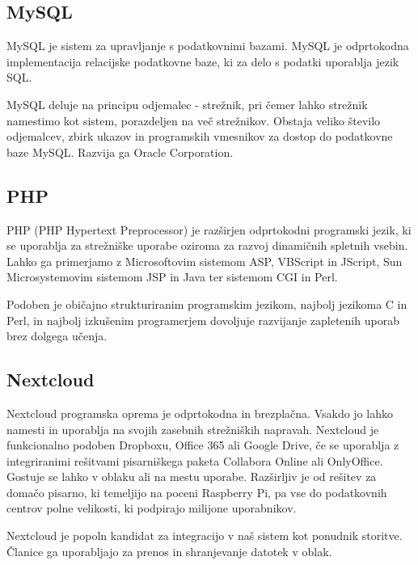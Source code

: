 \documentclass[a4paper,12pt,openright]{book}
\begin{document}
\subsection{MySQL}
MySQL je sistem za upravljanje s podatkovnimi bazami. MySQL je odprtokodna implementacija relacijske podatkovne baze, ki za delo s podatki uporablja jezik SQL.

MySQL deluje na principu odjemalec - strežnik, pri čemer lahko strežnik namestimo kot sistem, porazdeljen na več strežnikov. Obstaja veliko število odjemalcev, zbirk ukazov in programskih vmesnikov za dostop do podatkovne baze MySQL. Razvija ga Oracle Corporation. 

\subsection{PHP}
PHP\cite{php} (PHP Hypertext Preprocessor) je razširjen odprtokodni programski jezik, ki se uporablja za strežniške uporabe oziroma za razvoj dinamičnih spletnih vsebin. Lahko ga primerjamo z Microsoftovim sistemom ASP, VBScript in JScript, Sun Microsystemovim sistemom JSP in Java ter sistemom CGI in Perl.

Podoben je običajno strukturiranim programskim jezikom, najbolj jezikoma C in Perl, in najbolj izkušenim programerjem dovoljuje razvijanje zapletenih uporab brez dolgega učenja. 

\subsection{Nextcloud}

Nextcloud\cite{nextcloud} programska oprema je odprtokodna in brezplačna. Vsakdo jo lahko namesti in uporablja na svojih zasebnih strežniških napravah. 
Nextcloud je funkcionalno podoben Dropboxu, Office 365 ali Google Drive, če se uporablja z integriranimi rešitvami pisarniškega paketa Collabora Online ali OnlyOffice. Gostuje se lahko v oblaku ali na mestu uporabe. Razširljiv je od rešitev za domačo pisarno, ki temeljijo na poceni Raspberry Pi, pa vse do podatkovnih centrov polne velikosti, ki podpirajo milijone uporabnikov.

Nextcloud je popoln kandidat za integracijo v naš sistem kot ponudnik storitve. Članice ga uporabljajo za prenos in shranjevanje datotek v oblak. 
\end{document}
